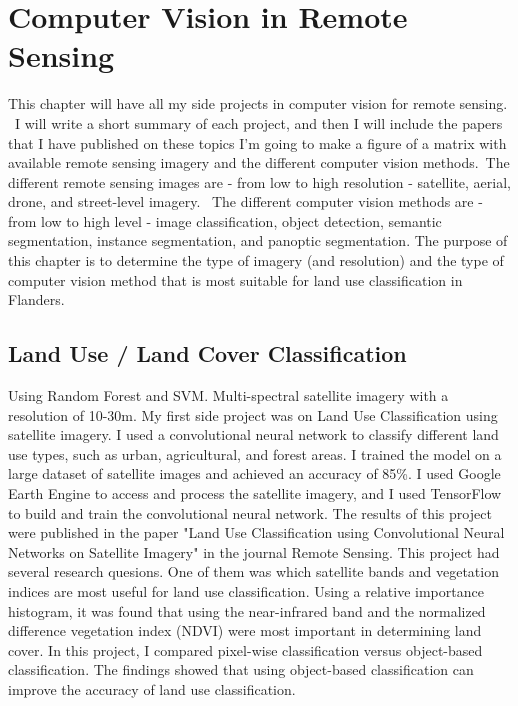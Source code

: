 \chapter{Computer Vision in Remote Sensing}\label{ch:chapter1}

This chapter will have all my side projects in computer vision for remote sensing. \
I will write a short summary of each project, and then I will include the papers that I have published on these topics
I'm going to make a figure of a matrix with available remote sensing imagery and the different computer vision methods.\
The different remote sensing images are - from low to high resolution - satellite, aerial, drone, and street-level imagery. \
The different computer vision methods are - from low to high level - image classification, object detection, semantic segmentation, instance segmentation, and panoptic segmentation.
The purpose of this chapter is to determine the type of imagery (and resolution) and the type of computer vision method that is most suitable for land use classification in Flanders.


\section{Land Use / Land Cover Classification}
Using Random Forest and SVM. Multi-spectral satellite imagery with a resolution of 10-30m. 
My first side project was on Land Use Classification using satellite imagery. I used a convolutional neural network to classify different land use types, such as urban, agricultural, and forest areas. I trained the model on a large dataset of satellite images and achieved an accuracy of 85\%.
I used Google Earth Engine to access and process the satellite imagery, and I used TensorFlow to build and train the convolutional neural network. The results of this project were published in the paper "Land Use Classification using Convolutional Neural Networks on Satellite Imagery" in the journal Remote Sensing.
This project had several research quesions. One of them was which satellite bands and vegetation indices are most useful for land use classification. Using a relative importance histogram, it was found that using the near-infrared band and the normalized difference vegetation index (NDVI) were most important in determining land cover.
In this project, I compared pixel-wise classification versus object-based classification. The findings showed that using object-based classification can improve the accuracy of land use classification. 


